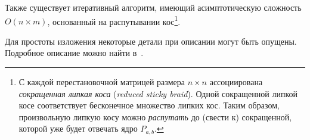 

Также существует итеративный алгоритм, имеющий асимптотическую сложность $O(n \times m)$, основанный на распутывании кос\footnote{С каждой перестановочной матрицей размера $n \times n$ ассоциирована \emph{сокращенная липкая коса} (\emph{reduced sticky braid}). Одной сокращенной липкой косе соответствует бесконечное множество липких кос. Таким образом, произвольную липкую косу можно \emph{распутать} до (свести к) сокращенной, которой уже будет отвечать ядро $P_{a,b}$.
}.


Для простоты изложения некоторые детали при описании могут быть опущены.
Подробное описание можно найти в~\cite{alex2007semilocal}.


